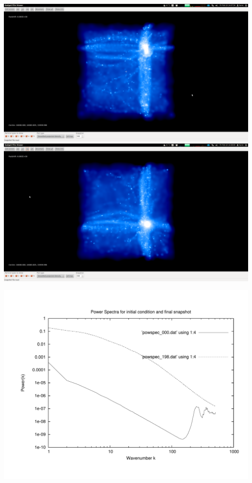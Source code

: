 \includegraphics[scale=0.12]{fuenfincr256_2/1.png} 
\includegraphics[scale=0.12]{fuenfincr256_2/2.png}

\includegraphics[scale=0.5]{fuenfincr256_2/plot_powspec_fuenfincr256_2}

